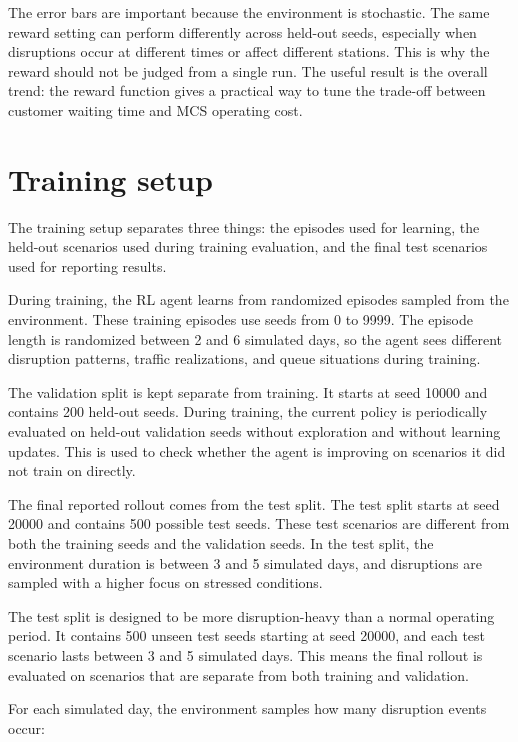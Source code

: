 \documentclass[11pt]{article}
\begin{document}
The error bars are important because the environment is stochastic. The
same reward setting can perform differently across held-out seeds,
especially when disruptions occur at different times or affect different
stations. This is why the reward should not be judged from a single run.
The useful result is the overall trend: the reward function gives a
practical way to tune the trade-off between customer waiting time and
MCS operating cost.

    \hypertarget{toc-training-setup}{}
    \section{Training setup}\label{training-setup}

The training setup separates three things: the episodes used for
learning, the held-out scenarios used during training evaluation, and
the final test scenarios used for reporting results.

During training, the RL agent learns from randomized episodes sampled
from the environment. These training episodes use seeds from 0 to 9999.
The episode length is randomized between 2 and 6 simulated days, so the
agent sees different disruption patterns, traffic realizations, and
queue situations during training.

The validation split is kept separate from training. It starts at seed
10000 and contains 200 held-out seeds. During training, the current
policy is periodically evaluated on held-out validation seeds without
exploration and without learning updates. This is used to check whether
the agent is improving on scenarios it did not train on directly.

The final reported rollout comes from the test split. The test split
starts at seed 20000 and contains 500 possible test seeds. These test
scenarios are different from both the training seeds and the validation
seeds. In the test split, the environment duration is between 3 and 5
simulated days, and disruptions are sampled with a higher focus on
stressed conditions.

The test split is designed to be more disruption-heavy than a normal
operating period. It contains 500 unseen test seeds starting at seed
20000, and each test scenario lasts between 3 and 5 simulated days. This
means the final rollout is evaluated on scenarios that are separate from
both training and validation.

For each simulated day, the environment samples how many disruption
events occur:
\end{document}
